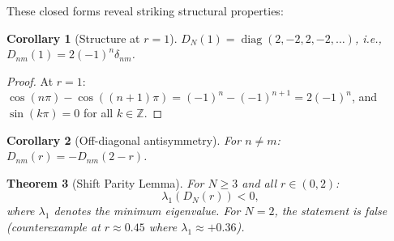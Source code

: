 \documentclass[12pt,a4paper]{article}
\newtheorem{theorem}{Theorem}[section]
\newtheorem{corollary}[theorem]{Corollary}
\theoremstyle{definition}
\theoremstyle{remark}
\begin{document}
These closed forms reveal striking structural properties:

\begin{corollary}[Structure at $r = 1$]
\label{cor:r-one}
$D_N(1) = \operatorname{diag}(2, -2, 2, -2, \ldots)$, i.e., $D_{nm}(1) = 2(-1)^n \delta_{nm}$.
\end{corollary}

\begin{proof}
At $r = 1$: $\cos(n\pi) - \cos((n{+}1)\pi) = (-1)^n - (-1)^{n+1} = 2(-1)^n$, and $\sin(k\pi) = 0$ for all $k \in \mathbb{Z}$.
\end{proof}

\begin{corollary}[Off-diagonal antisymmetry]
\label{cor:antisym}
For $n \neq m$: $D_{nm}(r) = -D_{nm}(2-r)$.
\end{corollary}

\begin{theorem}[Shift Parity Lemma]
\label{thm:shift-parity}
For $N \geq 3$ and all $r \in (0, 2)$:
\[
  \lambda_1(D_N(r)) < 0,
\]
where $\lambda_1$ denotes the minimum eigenvalue. For $N = 2$, the statement is false (counterexample at $r \approx 0.45$ where $\lambda_1 \approx +0.36$).
\end{theorem}
\end{document}
